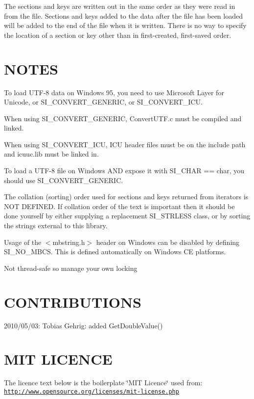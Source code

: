 The sections and keys are written out in the same order as they were read in from the file. Sections and keys added to the data after the file has been loaded will be added to the end of the file when it is written. There is no way to specify the location of a section or key other than in first-\/created, first-\/saved order.\hypertarget{index_notes}{}\section{N\+O\+T\+ES}\label{index_notes}

\begin{DoxyItemize}
\item To load U\+T\+F-\/8 data on Windows 95, you need to use Microsoft Layer for Unicode, or S\+I\+\_\+\+C\+O\+N\+V\+E\+R\+T\+\_\+\+G\+E\+N\+E\+R\+IC, or S\+I\+\_\+\+C\+O\+N\+V\+E\+R\+T\+\_\+\+I\+CU.
\item When using S\+I\+\_\+\+C\+O\+N\+V\+E\+R\+T\+\_\+\+G\+E\+N\+E\+R\+IC, Convert\+U\+T\+F.\+c must be compiled and linked.
\item When using S\+I\+\_\+\+C\+O\+N\+V\+E\+R\+T\+\_\+\+I\+CU, I\+CU header files must be on the include path and icuuc.\+lib must be linked in.
\item To load a U\+T\+F-\/8 file on Windows A\+ND expose it with S\+I\+\_\+\+C\+H\+AR == char, you should use S\+I\+\_\+\+C\+O\+N\+V\+E\+R\+T\+\_\+\+G\+E\+N\+E\+R\+IC.
\item The collation (sorting) order used for sections and keys returned from iterators is N\+OT D\+E\+F\+I\+N\+ED. If collation order of the text is important then it should be done yourself by either supplying a replacement S\+I\+\_\+\+S\+T\+R\+L\+E\+SS class, or by sorting the strings external to this library.
\item Usage of the $<$mbstring.\+h$>$ header on Windows can be disabled by defining S\+I\+\_\+\+N\+O\+\_\+\+M\+B\+CS. This is defined automatically on Windows CE platforms.
\item Not thread-\/safe so manage your own locking
\end{DoxyItemize}\hypertarget{index_contrib}{}\section{C\+O\+N\+T\+R\+I\+B\+U\+T\+I\+O\+NS}\label{index_contrib}

\begin{DoxyItemize}
\item 2010/05/03\+: Tobias Gehrig\+: added Get\+Double\+Value()
\end{DoxyItemize}\hypertarget{index_licence}{}\section{M\+I\+T L\+I\+C\+E\+N\+CE}\label{index_licence}
The licence text below is the boilerplate \char`\"{}\+M\+I\+T Licence\char`\"{} used from\+: \href{http://www.opensource.org/licenses/mit-license.php}{\tt http\+://www.\+opensource.\+org/licenses/mit-\/license.\+php}

